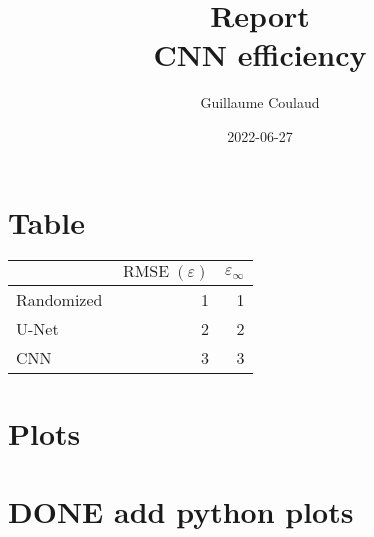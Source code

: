 \documentclass[a4paper,11pt]{article}
\author{Guillaume Coulaud}
\date{2022-06-27}
\title{Report\\\medskip
\large CNN efficiency}
\begin{document}
\maketitle
\tableofcontents



\section{Table}
\label{sec:org231cefa}
\begin{center}
\begin{tabular}{lrr}
 & \(\operatorname{RMSE}(\varepsilon)\) & \(\varepsilon_{\infty}\)\\
\hline
Randomized & 1 & 1\\
U-Net & 2 & 2\\
CNN & 3 & 3\\
\end{tabular}
\end{center}



\section{Plots}
\label{sec:org0d528b3}

\section{{\bfseries\sffamily DONE} add python plots}
\label{sec:org87c12f1}
\end{document}
